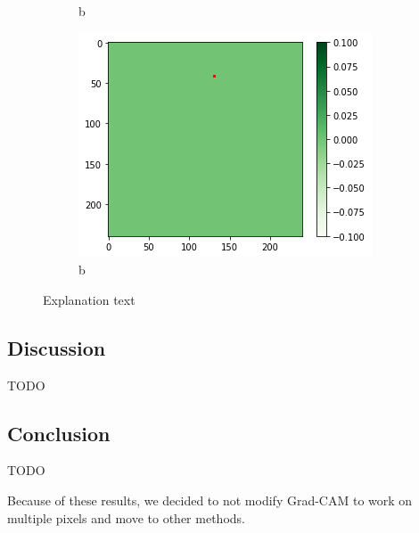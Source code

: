 \begin{figure}[H]
\begin{subfigure}{.33\textwidth}
        \caption{b}
    \end{subfigure}
        \begin{subfigure}{.33\textwidth}
        \centering
        \includegraphics[width=\linewidth]{chapters/04_segmentation/images/grad_cam_36.png}
        \caption{b}
    \end{subfigure}
    \caption{Explanation text}
\end{figure}

\subsection{Discussion}
TODO

\subsection{Conclusion}
TODO

Because of these results, we decided to not modify Grad-CAM to work on multiple pixels and move to other methods.
